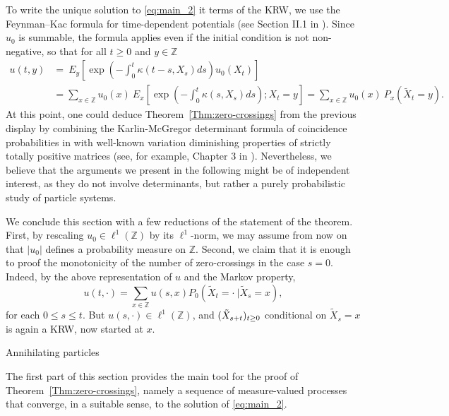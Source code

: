 \documentclass[12pt,reqno,oneside]{amsart}
\makeatletter
\numberwithin{equation}{section}
\renewcommand\subsection{\@startsection{subsection}{2}%
  \z@{-.5\linespacing\@plus-.7\linespacing}{.5\linespacing}%
  {\normalfont\scshape}}
\theoremstyle{definition}
\theoremstyle{remark}
\newcommand{\Z}{\mathbb{Z}}
\makeatother
\begin{document}
To write the unique solution to \eqref{eq:main_2} it terms of the KRW, we use
the Feynman--Kac formula for time-dependent potentials (see Section II.1 in
  \cite{CM94}). Since $u_0$ is summable, the formula applies even if the
initial condition is not non-negative, so that for all $t \geq 0$ and $y \in \Z$
\begin{align*}
  u(t,y) &
  = \ E_y\left[ \exp\left(-\int_0^t \kappa(t-s,X_s)ds\right) u_0(X_t)\right]
  \\ & =  \sum_{x \in \Z} u_0(x)\ E_x\left[ \exp\left(-\int_0^t
      \kappa(s,X_s)ds\right); X_t=y\right]
  =  \sum_{x \in \Z} u_0(x)\ P_{x}(\tilde{X}_t=y).
\end{align*}
At this point, one could deduce
  Theorem~\ref{Thm:zero-crossings} from the previous display by combining the
  Karlin-McGregor determinant formula of coincidence probabilities in
  \cite{Kar88} with well-known variation diminishing properties of strictly
  totally positive matrices (see, for example, Chapter 3 in \cite{Pin10}).
  Nevertheless, we believe that the arguments we present in the following
  might be of independent interest, as they do not involve determinants, but
  rather a purely probabilistic study of particle systems.

We conclude this section with a few reductions of the statement of the
theorem. First, by rescaling $u_0 \in \ell^1(\Z)$ by its $\ell^1$-norm, we
may assume from now on that $|u_0|$ defines a probability measure on $\Z$.
Second, we claim that it is enough to proof the monotonicity of the number of
zero-crossings in the case $s=0$. Indeed, by the above representation of $u$
and the Markov property,
\begin{equation*}
  u(t, \cdot )=\sum_{x \in \Z} u(s,x)P_0(\tilde{X}_{t} = \cdot \  | \tilde{X}_s =x),
\end{equation*}
for each $0 \leq s \leq t$. But $u(s,\cdot) \in \ell^1(\Z)$, and
$(\Tilde{X}_{s+t})_{t \geq 0}$  conditional on $\tilde{X}_s=x$ is again a
KRW, now started at $x$.

\subsection{Annihilating particles}
\label{sec:annihilatingparticles}

The first part of this section provides the main tool for the proof of
Theorem~\ref{Thm:zero-crossings}, namely a sequence of measure-valued
processes that converge, in a suitable sense, to the solution of
\eqref{eq:main_2}.
\end{document}
